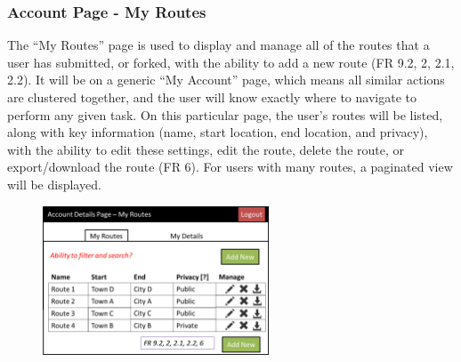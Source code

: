 \documentclass[a4paper,twoside,notitlepage,11pt]{article}
\begin{document}
\newpage 
\subsubsection{Account Page - My Routes}
The ``My Routes'' page is used to display and manage all of the routes that a user has submitted, or forked, with the ability to add a new route (FR 9.2, 2, 2.1, 2.2). It will be on a generic ``My Account'' page, which means all similar actions are clustered together, and the user will know exactly where to navigate to perform any given task. On this particular page, the user's routes will be listed, along with key information (name, start location, end location, and privacy), with the ability to edit these settings, edit the route, delete the route, or export/download the route (FR 6). For users with many routes, a paginated view will be displayed.
\begin{figure}[!ht]
	\begin{center}
		\includegraphics[width=0.6\textwidth]{images/ui-myroutes.png}
	\end{center}
	\vspace{-6mm}
\end{figure}\ \\
\end{document}
